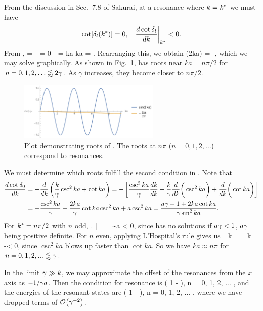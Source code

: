 \begin{solution}
	From the discussion in Sec.~7.8 of Sakurai, at a resonance where $k = k^*$ we must have
	\begin{align} \label{conds}
		\cot[\delta_l(k^*)] &= 0, &
		\left. \dv{\cot\delta_l}{k} \right|_{k^*} < 0.
	\end{align}
	From ,
	\beq
		\cot\delo = - = 0
		\qimplies
		- = \sin ka \cos ka = .
	\eeq
	Rearranging this, we obtain
	\beqn \label{thingy}
		\sin(2ka) = -,
	\eeqn
	which we may solve graphically.  As shown in Fig.~\ref{plot3},  has roots near $ka = n \pi / 2$ for $n = 0, 1, 2, \ldots \lessapprox 2\gamma$.  As $\gamma$ increases, they become closer to $n\pi/2$.
	
	\begin{figure} \centering
		\includegraphics[width=0.6\textwidth]{plot3}
		\caption{Plot demonstrating roots of .  The roots at $n \pi$ ($n = 0, 1, 2, \ldots$) correspond to resonances.}
		\label{plot3}
	\end{figure}
	
	We must determine which roots fulfill the second condition in .  Note that
	\begin{align}
		\dv{\cot\delta_0}{k} &= -\dv{k} \left( \frac{k}{\gamma} \csc^2 ka + \cot ka \right)
		= -\left[ \frac{\csc^2 ka}{\gamma} \dv{k}{k} + \frac{k}{\gamma} \dv{k} \bigg( \csc^2 ka \bigg) + \dv{k} \bigg( \cot ka \bigg) \right] \notag \\
		&=  -\frac{\csc^2 ka}{\gamma} + \frac{2 ka}{\gamma} \cot ka \csc^2 ka + a \csc^2 ka
		= \frac{a\gamma - 1 + 2 ka \cot ka}{\gamma \sin^2 ka}. \label{delder}
	\end{align}
	For $k^* = n\pi/2$ with $n$ odd,
	\beq
		\left.  \right|_{\ks} =  \sim a \not< 0,
	\eeq
	since  has no solutions if $a \gamma < 1$, $a\gamma$ being positive definite.  For $n$ even, applying L'Hospital's rule gives us
	\beq
		\lim_{k \to \ks}  = \lim_{k \to \ks}  = -\infty < 0,
	\eeq
	since $\csc^2 ka$ blows up faster than $\cot ka$.  So we have $ka \approx n\pi$ for $n = 0, 1, 2, ... \lessapprox \gamma$.
	
	In the limit $\gamma \gg k$, we may approximate the offset of the resonances from the $x$ axis as $-1 / \gamma a$.  Then the condition for resonance is
	\beq
		\kn \approx {} \left( 1 -  \right), \quad n = 0, 1, 2, ... \lessapprox \gam,
	\eeq
	and the energies of the resonant states are
	\beq
		\En \approx {} \left( 1 -  \right), \quad n = 0, 1, 2, ... \lessapprox \gam,
	\eeq
	where we have dropped terms of $\order{\gam^{-2}}$.
\end{solution}

